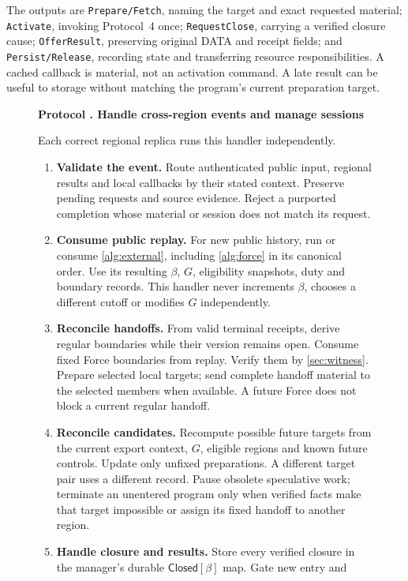 \documentclass[11pt,a4paper]{article}
\newcommand{\tagg}[1]{\ensuremath{\mathsf{#1}}}
\newcounter{protocol}
\newenvironment{protocol}[3][htbp]{\begin{figure}[#1]\refstepcounter{protocol}\label{#2}
\begin{mdframed}[linewidth=.6pt,skipabove=0pt,skipbelow=0pt,
innertopmargin=7pt,innerbottommargin=7pt]\small
\textbf{Protocol \theprotocol. #3}\par\smallskip}{\end{mdframed}\end{figure}}
\begin{document}
The outputs are \texttt{Prepare/Fetch}, naming the target and exact
requested material; \texttt{Activate}, invoking Protocol~4 once;
\texttt{RequestClose}, carrying a verified closure cause;
\texttt{OfferResult}, preserving original DATA and receipt fields;
and \texttt{Persist/Release}, recording state and transferring resource
responsibilities. A cached callback is material, not an activation
command. A late result can be useful to storage without matching the
program's current preparation target.



\begin{protocol}[H]{alg:rotation}{Handle cross-region events and manage sessions}
Each correct regional replica runs this handler independently.
\begin{enumerate}[label=\textbf{\arabic*)},itemsep=3pt]
\item \textbf{Validate the event.} Route authenticated public input,
regional results and local callbacks by their stated context. Preserve
pending requests and source evidence. Reject a purported completion
whose material or session does not match its request.
\item \textbf{Consume public replay.} For new public history, run or
consume \cref{alg:external}, including \cref{alg:force} in its canonical
order. Use its resulting $\beta$, $G$, eligibility snapshots, duty and
boundary records. This handler never increments $\beta$, chooses a
different cutoff or modifies $G$ independently.
\item \textbf{Reconcile handoffs.} From valid terminal receipts,
derive regular boundaries while their version remains open. Consume
fixed Force boundaries from replay. Verify them by
\cref{sec:witness}. Prepare selected local targets; send complete
handoff material to the selected members when available. A future
Force does not block a current regular handoff.
\item \textbf{Reconcile candidates.} Recompute possible future
targets from the current export context, $G$, eligible regions and
known future controls. Update only unfixed preparations. A different
target pair uses a different record. Pause obsolete speculative work;
terminate an unentered program only when verified facts make that
target impossible or assign its fixed handoff to another region.
\item \textbf{Handle closure and results.} Store every verified closure
in the manager's durable $\tagg{Closed}[\beta]$ map. Gate new entry and

\end{enumerate}
\end{protocol}
\end{document}
